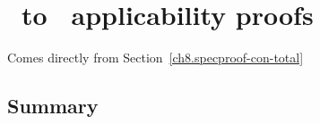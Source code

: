 \chapter{\Abs\ to \Betw\ applicability proofs}\label{ch13}

Comes directly from Section~\ref{ch8.specproof-con-total}

\newpage
\section{Summary}\label{ch13.summary}

\ldefsummary %
\lthmsummary %
\lthmaddeddefsummary %
\lthmaddedthmsummary %
\lzevessummary %
